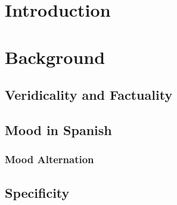 \section{Introduction}

\section{Background}
\subsection{Veridicality and Factuality}
\subsection{Mood in Spanish}
\subsubsection{Mood Alternation}
\subsection{Specificity}